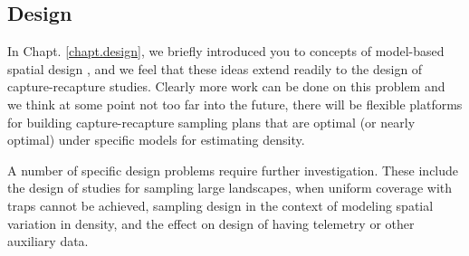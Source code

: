 \subsection{Design}

In Chapt. \ref{chapt.design}, we briefly introduced you to concepts of
model-based spatial design \citep{muller:2007}, and we feel that these
ideas extend readily to the design of capture-recapture studies.
Clearly more work can be done on this problem and we think at some
point not too far into the future, there will be flexible platforms
for building capture-recapture sampling plans that are optimal (or
nearly optimal) under specific models for estimating density.

A number of specific design problems require further
investigation. These include the design of studies for sampling large
landscapes, when uniform coverage with traps cannot be achieved,
sampling design in the context of modeling spatial variation in
density, and the effect on design of having telemetry or other
auxiliary data.

